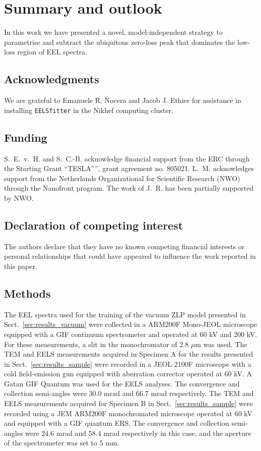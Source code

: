 \section{Summary and outlook}
\label{sec:summary}

In this work we have presented a novel, model-independent strategy to parametrise and subtract
the ubiquitous zero-loss peak that dominates  the low-loss region
of EEL spectra.

\subsection*{Acknowledgments}

We are grateful to Emanuele R. Nocera and Jacob J. Ethier for
assistance in installing {\tt EELSfitter} in the Nikhef computing cluster.


\subsection*{Funding}

S.~E.~v.~H. and S.~C.-B. acknowledge financial support
from the ERC through the Starting Grant ``TESLA”'', grant agreement
no. 805021.
%
L.~M. acknowledges support from the
Netherlands Organizational for Scientific Research (NWO)
through the Nanofront program.
%
The work of J.~R. has been partially supported by NWO.

\subsection*{Declaration of competing interest}

The authors declare that they have no known competing financial interests or personal relationships that could have appeared to influence the work reported in this paper.

\subsection*{Methods}

{\justify
The EEL spectra used for the training of the vacuum ZLP model presented in Sect.~\ref{sec:results_vacuum} were collected in a ARM200F Mono-JEOL microscope equipped with a GIF continuum spectrometer and operated at 60 kV and 200 kV. For these measurements, a slit in the monochromator of 2.8 $\mu$m was used.
%
The TEM and EELS measurements acquired in Specimen A for the results presented in
Sect.~\ref{sec:results_sample} were recorded in a JEOL 2100F microscope with a cold field-emission
gun equipped with aberration corrector operated at 60 kV. A Gatan GIF Quantum was used for
the EELS analyses. The convergence and collection semi-angles were 30.0 mrad and 66.7 mrad respectively.
%
The TEM and EELS measurements acquired for Specimen B in Sect.~\ref{sec:results_sample}
were recorded using a JEM ARM200F monochromated microscope operated at 60 kV and equipped with
a GIF quantum ERS. The convergence and collection semi-angles were 24.6 mrad and 58.4 mrad respectively
in this case, and the aperture of the spectrometer was set to 5 mm.}

